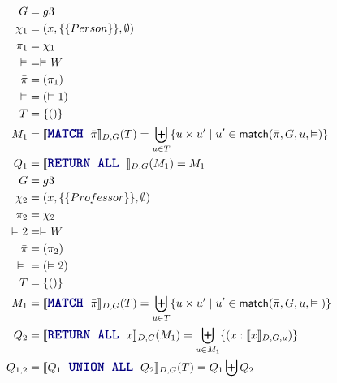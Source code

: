 \documentclass[fleqn]{article}
\newcommand{\rel}[1][]{ \vDash_{#1}}
\newcommand{\sem}[1]{\llbracket #1 \rrbracket_{D,G}}
\newcommand{\semex}[1]{\llbracket #1 \rrbracket_{D,G,u}}
\newcommand\bluetext[1]{{\allowbreak\bluetextcolor{#1}}}
\newcommand{\mathblue}[1]{\textsf{\bluetext{#1}}}
\newcommand\bluetextcolor[1]{{\textcolor{GQLBlue}{%
    \large\ttfamily\bfseries{\detokenize{#1}}}}}
\begin{document}
\begin{align*}
    G &= g3 \\
    \chi_{1} &= (x, \{\{Person\}\}, \emptyset) \\
    \pi_{1} &= \chi_{1} \\
    \rel &= \rel{W} \\
    \Bar{\pi} &= (\pi_{1}) \\
    \rel &= (\rel{1}) \\
    T &= \{()\} \\
    M_{1} &= \sem{\mathblue{MATCH } \Bar{\pi}}(T) = \biguplus_{u \in T} \{u \times u' \mid u' \in \textsf{match}(\Bar{\pi}, G, u, \rel)\} \\
    Q_1 &= \sem{\mathblue{RETURN ALL } \*}(M_{1}) = M_{1} \\
    G &= g3 \\
    \chi_{2} &= (x, \{\{Professor\}\}, \emptyset) \\
    \pi_{2} &= \chi_{2} \\
    \rel{2} &= \rel{W} \\
    \Bar{\pi} &= (\pi_{2}) \\
    \rel{} &= (\rel{2}) \\
    T &= \{()\} \\
    M_{1} &= \sem{\mathblue{MATCH } \Bar{\pi}}(T) = \biguplus_{u \in T} \{u \times u' \mid u' \in \textsf{match}(\Bar{\pi}, G, u, \rel{})\} \\
    Q_2 &= \sem{\mathblue{RETURN ALL } x}(M_{1}) = \biguplus_{u \in M_{1}} \{(x: \semex{x})\} \\
    Q_{1, 2} &= \sem{Q_{1} \mathblue{ UNION ALL }Q_2}(T) = Q_{1} \biguplus Q_2 \\
\end{align*}
\end{document}
